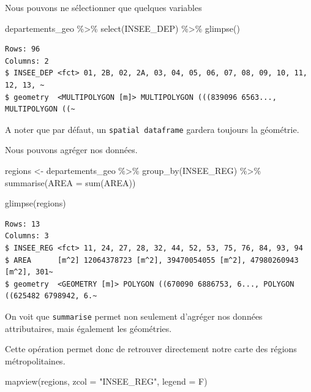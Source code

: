 \documentclass[
]{book}
\newenvironment{Shaded}{\begin{snugshade}}{\end{snugshade}}
\newcommand{\AttributeTok}[1]{\textcolor[rgb]{0.77,0.63,0.00}{#1}}
\newcommand{\FunctionTok}[1]{\textcolor[rgb]{0.00,0.00,0.00}{#1}}
\newcommand{\NormalTok}[1]{#1}
\newcommand{\OtherTok}[1]{\textcolor[rgb]{0.56,0.35,0.01}{#1}}
\newcommand{\SpecialCharTok}[1]{\textcolor[rgb]{0.00,0.00,0.00}{#1}}
\newcommand{\StringTok}[1]{\textcolor[rgb]{0.31,0.60,0.02}{#1}}
\begin{document}
Nous pouvons ne sélectionner que quelques variables

\begin{Shaded}
\begin{Highlighting}[]
\NormalTok{departements\_geo }\SpecialCharTok{\%\textgreater{}\%}
  \FunctionTok{select}\NormalTok{(INSEE\_DEP) }\SpecialCharTok{\%\textgreater{}\%}
  \FunctionTok{glimpse}\NormalTok{()}
\end{Highlighting}
\end{Shaded}

\begin{verbatim}
Rows: 96
Columns: 2
$ INSEE_DEP <fct> 01, 2B, 02, 2A, 03, 04, 05, 06, 07, 08, 09, 10, 11, 12, 13, ~
$ geometry  <MULTIPOLYGON [m]> MULTIPOLYGON (((839096 6563..., MULTIPOLYGON ((~
\end{verbatim}

A noter que par défaut, un \texttt{spatial\ dataframe} gardera toujours la géométrie.

Nous pouvons agréger nos données.

\begin{Shaded}
\begin{Highlighting}[]
\NormalTok{regions }\OtherTok{\textless{}{-}}\NormalTok{ departements\_geo }\SpecialCharTok{\%\textgreater{}\%}
  \FunctionTok{group\_by}\NormalTok{(INSEE\_REG) }\SpecialCharTok{\%\textgreater{}\%}
  \FunctionTok{summarise}\NormalTok{(}\AttributeTok{AREA =} \FunctionTok{sum}\NormalTok{(AREA))}

\FunctionTok{glimpse}\NormalTok{(regions)}
\end{Highlighting}
\end{Shaded}

\begin{verbatim}
Rows: 13
Columns: 3
$ INSEE_REG <fct> 11, 24, 27, 28, 32, 44, 52, 53, 75, 76, 84, 93, 94
$ AREA      [m^2] 12064378723 [m^2], 39470054055 [m^2], 47980260943 [m^2], 301~
$ geometry  <GEOMETRY [m]> POLYGON ((670090 6886753, 6..., POLYGON ((625482 6798942, 6.~
\end{verbatim}

On voit que \texttt{summarise} permet non seulement d'agréger nos données attributaires, mais également les géométries.

Cette opération permet donc de retrouver directement notre carte des régions métropolitaines.

\begin{Shaded}
\begin{Highlighting}[]
\FunctionTok{mapview}\NormalTok{(regions, }\AttributeTok{zcol =} \StringTok{"INSEE\_REG"}\NormalTok{, }\AttributeTok{legend =}\NormalTok{ F)}
\end{Highlighting}
\end{Shaded}
\end{document}
